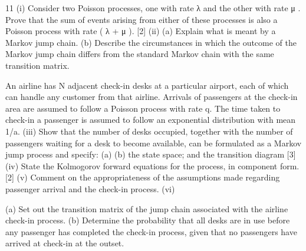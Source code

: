 \documentclass[a4paper,12pt]{article}
\begin{document}
\begin{enumerate}
11
(i) Consider two Poisson processes, one with rate λ and the other with rate μ .
Prove that the sum of events arising from either of these processes is also a
Poisson process with rate ( λ + μ ).
[2]
(ii) (a) Explain what is meant by a Markov jump chain.
(b) Describe the circumstances in which the outcome of the Markov jump
chain differs from the standard Markov chain with the same transition
matrix.

An airline has N adjacent check-in desks at a particular airport, each of which can
handle any customer from that airline. Arrivals of passengers at the check-in area are assumed to follow a Poisson process with rate q. The time taken to check-in a
passenger is assumed to follow an exponential distribution with mean 1/a.
(iii)
Show that the number of desks occupied, together with the number of passengers waiting for a desk to become available, can be formulated as a
Markov jump process and specify:
(a)
(b)
the state space; and
the transition diagram
[3]
(iv) State the Kolmogorov forward equations for the process, in component form.
[2]
(v) Comment on the appropriateness of the assumptions made regarding passenger arrival and the check-in process.
(vi)

(a) Set out the transition matrix of the jump chain associated with the airline check-in process.
(b) Determine the probability that all desks are in use before any passenger has completed the check-in process, given that no passengers have
arrived at check-in at the outset.


\end{enumerate}
\end{document}
